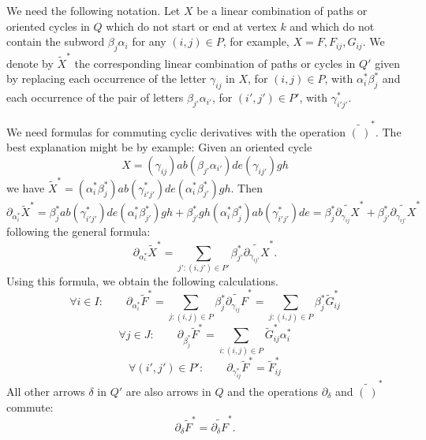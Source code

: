 We need the following notation. Let $X$ be a linear combination of paths or oriented cycles in $Q$ which do not start or end at vertex $k$ and which do not contain the subword $\beta_j\alpha_i$ for any $(i,j)\in P$, for example, $X=F,F_{ij},G_{ij}$. We denote by $\widetilde X^\ast$ the corresponding linear combination of paths or cycles in $Q'$ given by replacing each occurrence of the letter $\gamma_{ij}$ in $X$, for $(i,j)\in P$, with $\alpha_i^\ast\beta_j^\ast$ and each occurrence of the pair of letters $\beta_{j'}\alpha_{i'}$, for $(i',j')\in P'$, with $\gamma_{i'j'}^\ast$. 

We need formulas for commuting cyclic derivatives with the operation $\widetilde{(\ )}^\ast$. The best explanation might be by example: Given an oriented cycle 
\[X=(\gamma_{ij})ab(\beta_{j'}\alpha_{i'})de(\gamma_{ij'})gh
\]
 we have $\widetilde X^\ast=
(\alpha_i^\ast\beta_j^\ast)  ab( \gamma_{i'j'}^\ast )de(\alpha_i^\ast\beta_{j'}^\ast )gh$. Then 
\[
\partial_{\alpha_i^\ast} \widetilde X^\ast=\beta_j^\ast  ab( \gamma_{i'j'}^\ast )de(\alpha_i^\ast\beta_{j'}^\ast )gh+
\beta_{j'}^\ast gh (\alpha_i^\ast\beta_j^\ast)  ab( \gamma_{i'j'}^\ast )de
= \beta_j^\ast \widetilde{\partial_{\gamma_{ij}}X}^\ast+\beta_{j'}^\ast \widetilde{\partial_{\gamma_{ij'}}X}^\ast
\]
following the general formula:
\[
	\partial_{\alpha_i^\ast} \widetilde X^\ast=\sum_{j':(i,j')\in P'}\beta_{j'}^\ast \widetilde{\partial_{\gamma_{ij'}}X}^\ast .
\]
Using this formula, we obtain the following calculations.
\begin{equation}\label{eq: derivative of tilde F}
	\forall i\in I:\qquad \partial_{\alpha_i^\ast}\widetilde F^\ast=\sum_{j:(i,j)\in P}\beta_{j}^\ast \widetilde{\partial_{\gamma_{ij}}F}^\ast
	=\sum_{j:(i,j)\in P}\beta_{j}^\ast \widetilde G_{ij}^\ast
\end{equation}
\[
	\forall j\in J:\qquad \partial_{\beta_j^\ast}\widetilde F^\ast=\sum_{i:(i,j)\in P} \widetilde G_{ij}^\ast\alpha_{i}^\ast
\]
\[
	\forall (i',j')\in P': \qquad \partial_{\gamma_{ij}^\ast}\widetilde F^\ast=\widetilde F_{ij}^\ast
\]
All other arrows $\delta$ in $Q'$ are also arrows in $Q$ and the operations $\partial_\delta$ and $\widetilde{(\ )}^\ast$ commute:
\[
	\partial_\delta \widetilde F^\ast=\widetilde{\partial_\delta F}^\ast.
\]


